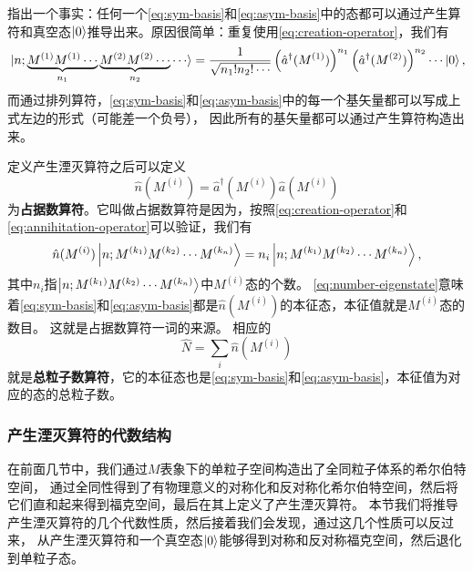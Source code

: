 \documentclass[hyperref, UTF8, a4paper]{ctexart}
\begin{document}
指出一个事实：任何一个\eqref{eq:sym-basis}和\eqref{eq:asym-basis}中的态都可以通过产生算符和真空态$\ket{0}$推导出来。原因很简单：重复使用\eqref{eq:creation-operator}，我们有
\begin{equation}
    \ket*{n; \underbrace{M^{(1)} M^{(1)} \cdots}_{n_1} \underbrace{M^{(2)} M^{(2)} \cdots}_{n_2} \cdots} = \frac{1}{\sqrt{n_1! n_2! \cdots}} \left(\hat{a}^\dagger (M^{(1)})\right)^{n_1} \left(\hat{a}^\dagger (M^{(2)})\right)^{n_2} \cdots \ket{0},
    \label{eq:creation-basis}
\end{equation}
而通过排列算符，\eqref{eq:sym-basis}和\eqref{eq:asym-basis}中的每一个基矢量都可以写成上式左边的形式（可能差一个负号），
因此所有的基矢量都可以通过产生算符构造出来。

定义产生湮灭算符之后可以定义
\begin{equation}
    \hat{n}(M^{(i)}) = \hat{a}^\dagger (M^{(i)}) \hat{a} (M^{(i)})
    \label{eq:number-operator}
\end{equation}
为\textbf{占据数算符}。它叫做占据数算符是因为，按照\eqref{eq:creation-operator}和\eqref{eq:annihitation-operator}可以验证，我们有
\begin{equation}
    \hat{n}(M^{(i)}) \ket{n; M^{(k_1)} M^{(k_2)} \cdots M^{(k_n)}} = n_i \ket{n; M^{(k_1)} M^{(k_2)} \cdots M^{(k_n)}},
    \label{eq:number-eigenstate}
\end{equation}
其中$n_i$指$\ket{n; M^{(k_1)} M^{(k_2)} \cdots M^{(k_n)}}$中$M^{(i)}$态的个数。
\eqref{eq:number-eigenstate}意味着\eqref{eq:sym-basis}和\eqref{eq:asym-basis}都是$\hat{n}(M^{(i)})$的本征态，本征值就是$M^{(i)}$态的数目。
这就是占据数算符一词的来源。
相应的
\begin{equation}
    \hat{N} = \sum_i \hat{n}(M^{(i)})
    \label{eq:total-number-operator}
\end{equation}
就是\textbf{总粒子数算符}，它的本征态也是\eqref{eq:sym-basis}和\eqref{eq:asym-basis}，本征值为对应的态的总粒子数。

\subsubsection{产生湮灭算符的代数结构}

在前面几节中，我们通过$M$表象下的单粒子空间构造出了全同粒子体系的希尔伯特空间，
通过全同性得到了有物理意义的对称化和反对称化希尔伯特空间，然后将它们直和起来得到福克空间，最后在其上定义了产生湮灭算符。
本节我们将推导产生湮灭算符的几个代数性质，然后接着我们会发现，通过这几个性质可以反过来，
从产生湮灭算符和一个真空态$\ket{0}$能够得到对称和反对称福克空间，然后退化到单粒子态。
\end{document}
